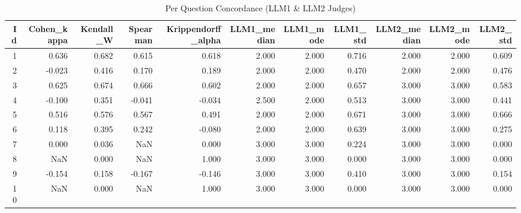 \begin{table}
\caption{Per Question Concordance (LLM1 & LLM2 Judges)}
\label{tab:per_question_concordance_LLM_judges}
\begin{tabular}{rrrrrrrrrrr}
\toprule
Id & Cohen_kappa & Kendall_W & Spearman & Krippendorff_alpha & LLM1_median & LLM1_mode & LLM1_std & LLM2_median & LLM2_mode & LLM2_std \\
\midrule
1 & 0.636 & 0.682 & 0.615 & 0.618 & 2.000 & 2.000 & 0.716 & 2.000 & 2.000 & 0.609 \\
2 & -0.023 & 0.416 & 0.170 & 0.189 & 2.000 & 2.000 & 0.470 & 2.000 & 2.000 & 0.476 \\
3 & 0.625 & 0.674 & 0.666 & 0.602 & 2.000 & 2.000 & 0.657 & 3.000 & 3.000 & 0.583 \\
4 & -0.100 & 0.351 & -0.041 & -0.034 & 2.500 & 2.000 & 0.513 & 3.000 & 3.000 & 0.441 \\
5 & 0.516 & 0.576 & 0.567 & 0.491 & 2.000 & 2.000 & 0.671 & 3.000 & 3.000 & 0.666 \\
6 & 0.118 & 0.395 & 0.242 & -0.080 & 2.000 & 2.000 & 0.639 & 3.000 & 3.000 & 0.275 \\
7 & 0.000 & 0.036 & NaN & 0.000 & 3.000 & 3.000 & 0.224 & 3.000 & 3.000 & 0.000 \\
8 & NaN & 0.000 & NaN & 1.000 & 3.000 & 3.000 & 0.000 & 3.000 & 3.000 & 0.000 \\
9 & -0.154 & 0.158 & -0.167 & -0.146 & 3.000 & 3.000 & 0.410 & 3.000 & 3.000 & 0.154 \\
10 & NaN & 0.000 & NaN & 1.000 & 3.000 & 3.000 & 0.000 & 3.000 & 3.000 & 0.000 \\
\bottomrule
\end{tabular}
\end{table}

